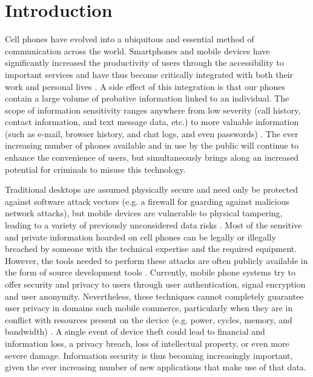 \documentclass[conference,10pt]{IEEEtran}
\begin{document}




%
\IEEEpeerreviewmaketitle

\section{Introduction}
Cell phones have evolved into a ubiquitous and essential method of communication across the world.  
Smartphones and mobile devices have significantly increased the productivity of users through the 
accessibility to important services and have thus become critically integrated with both their work 
and personal lives \cite{mobile}.   A side effect of this integration is that our phones contain a 
large volume of probative information linked to an individual.  The scope of information sensitivity 
ranges anywhere from low severity (call history, contact information, and text message data, etc.) 
to more valuable information (such as e-mail, browser history, and chat logs, and even passwords) 
\cite{lost_phone}.  The ever increasing number of phones available and in use by the public will 
continue to enhance the convenience of users, but simultaneously brings along an increased potential 
for criminals to misuse this technology.

Traditional desktops are assumed physically secure and need only be protected against software 
attack vectors (e.g. a firewall for guarding against malicious network attacks), but mobile devices 
are vulnerable to physical tampering, leading to a variety of previously unconsidered data risks 
\cite{mobile}.  Most of the sensitive and private information hoarded on cell phones can be legally 
or illegally breached by someone with the technical expertise and the required equipment.  However, 
the tools needed to perform these attacks are often publicly available in the form of source 
development tools \cite{forensics}.  Currently, mobile phone systems try to offer security and 
privacy to users through user authentication, signal encryption and user anonymity. Nevertheless, 
these techniques cannot completely guarantee user privacy in domains such mobile commerce, 
particularly when they are in conflict with resources present on the device (e.g. power, cycles, 
memory, and bandwidth) \cite{mobile}.  A single event of device theft could lead to financial and 
information loss, a privacy breach, loss of intellectual property, or even more severe damage.  
Information security is thus becoming increasingly important, given the ever increasing number of 
new applications that make use of that data.
\end{document}
